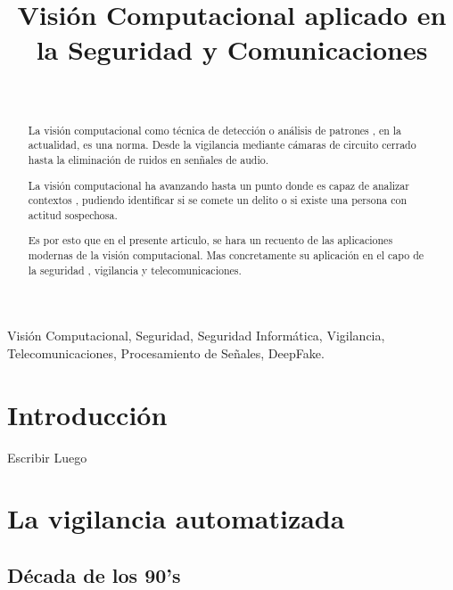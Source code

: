 \documentclass[a4paper]{IEEEtranUNT}
\begin{document}
\title{Visión Computacional aplicado en la Seguridad y Comunicaciones\\
}

\author{\\
}


\maketitle

\begin{abstract}
La visión computacional como técnica de detección o análisis de patrones , en la actualidad, es una norma. Desde la vigilancia mediante
cámaras de circuito cerrado hasta la eliminación de ruidos en sen\~nales de audio.

La visión computacional ha avanzando hasta un punto donde es capaz de analizar contextos , pudiendo identificar si se comete un delito o
si existe una persona con actitud sospechosa.

Es por esto que en el presente articulo, se hara un recuento de las aplicaciones modernas de la visión computacional. Mas concretamente su
aplicación en el capo de la seguridad , vigilancia y telecomunicaciones.

\end{abstract}

\begin{IEEEkeywords}
Visión Computacional, Seguridad, Seguridad Informática, Vigilancia, Telecomunicaciones, Procesamiento de Se\~nales,
DeepFake.
\end{IEEEkeywords}

\section{Introducción}

Escribir Luego

\section{La vigilancia automatizada}

\subsection{Década de los 90's}
\end{document}
